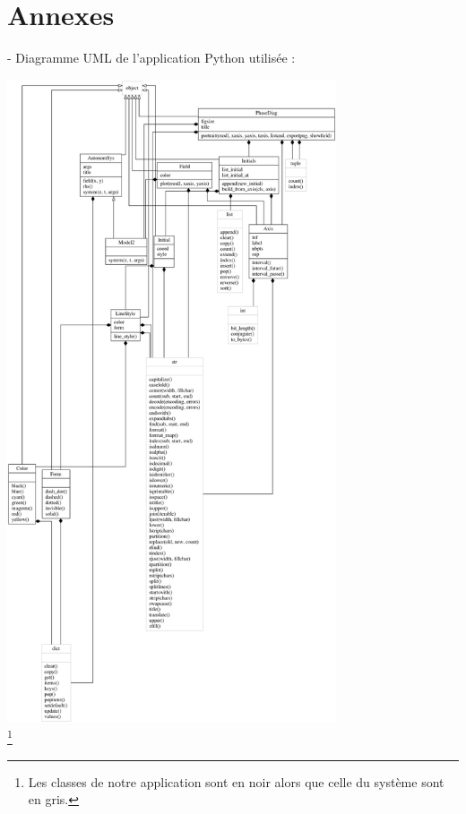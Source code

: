 \documentclass{article}
\begin{document}
\newpage
\section{Annexes}
 - Diagramme UML de l'application Python utilisée :\\
\begin{center}
    \includegraphics[height = 19cm]{../../pysrc/uml/diagramme_UML.png}\\
    \footnote{Les classes de notre application sont en noir alors que celle du système sont en gris.} 
\end{center}
\end{document}
